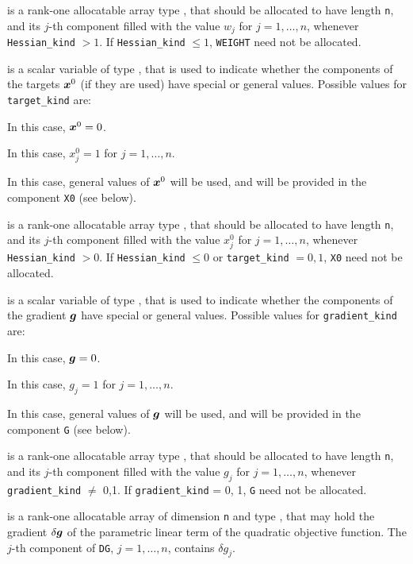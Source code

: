 \documentclass{galahad}
\begin{document}
\begin{description}
 is a rank-one allocatable array type \realdp, that 
should be allocated to have length {\tt n}, and its $j$-th component 
filled with the value $w_{j}$ for $j = 1, \ldots , n$, 
whenever {\tt Hessian\_kind} $>1$.
If {\tt Hessian\_kind} $\leq 1$, {\tt WEIGHT} need not be allocated.

 is a scalar variable of type \integer, 
that is used to indicate whether the components of the targets ${\bm{x}}^0$ 
(if they are used) have special or general values. Possible values for 
{\tt target\_kind} are:
\begin{description}
  In this case, ${\bm{x}}^0 = 0$.

 In this case, $x^0_{j} = 1$ for $j = 1, \ldots , n$.

 In this case, general values of ${\bm{x}}^0$ will be used,
     and will be provided in the component {\tt X0} (see below).
\end{description}

 is a rank-one allocatable array type \realdp, that 
should be allocated to have length {\tt n}, and its $j$-th component 
filled with the value $x_{j}^0$ for $j = 1, \ldots , n$, 
whenever {\tt Hessian\_kind} $>0$.
If {\tt Hessian\_kind} $\leq 0$  or {\tt target\_kind} $= 0,1$,
{\tt X0} need not be allocated.

 is a scalar variable of type \integer, 
that is used to indicate whether the components of the gradient ${\bm{g}}$ 
have special or general values. Possible values for {\tt gradient\_kind} are:
\begin{description}
  In this case, ${\bm{g}} = 0$.

 In this case, $g_{j} = 1$ for $j = 1, \ldots , n$.

 In this case, general values of ${\bm{g}}$ will be used,
     and will be provided in the component {\tt G} (see below).
\end{description}

 is a rank-one allocatable array type \realdp, that 
should be allocated to have length {\tt n}, and its $j$-th component 
filled with the value $g_{j}$ for $j = 1, \ldots , n$, 
whenever {\tt gradient\_kind} $\neq$ 0,1.
If {\tt gradient\_kind} {= 0, 1}, {\tt G} need not be allocated.

 is a rank-one allocatable array of dimension {\tt n} and type 
\realdp, that may hold the gradient $\delta {\bm{g}}$ 
of the parametric linear term of the quadratic objective function.
The $j$-th component of 
{\tt DG}, $j = 1,  \ldots ,  n$, contains $\delta g_{j}$.


\end{description}
\end{document}
